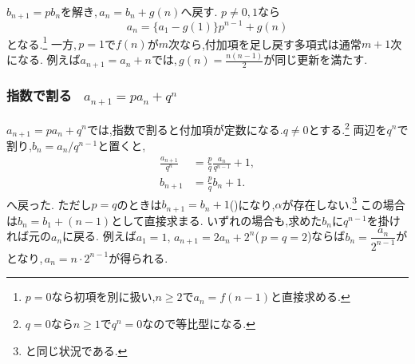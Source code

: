    $b_{n+1}=pb_n$を解き,\,$a_n=b_n+g(n)$へ戻す.
    $p\ne0,1$なら
    \[
      a_n=\{a_1-g(1)\}p^{n-1}+g(n)
    \]
    となる.\footnote{$p=0$なら初項を別に扱い,$n\ge2$で$a_n=f(n-1)$と直接求める.}
    一方,\,$p=1$で$f(n)$が$m$次なら,付加項を足し戻す多項式は通常$m+1$次になる.
    例えば$a_{n+1}=a_n+n$では,\,$g(n)=\frac{n(n-1)}2$が同じ更新を満たす.

  \subsubsection{\texorpdfstring{指数で割る  \, $\displaystyle a_{n+1}=pa_n+q^n$}{指数で割る}}
    $a_{n+1}=pa_n+q^n$では,指数で割ると付加項が定数になる.$q\ne0$とする.\footnote{$q=0$なら$n\ge1$で$q^n=0$なので等比型になる.}
    両辺を$q^n$で割り,$b_n=a_n/q^{n-1}$と置くと,
    \[
      \begin{aligned}
        \frac{a_{n+1}}{q^n}&=\frac pq\frac{a_n}{q^{n-1}}+1,\\
        b_{n+1}&=\frac pq b_n+1.
      \end{aligned}
    \]
    へ戻った.
    ただし$p=q$のときは$b_{n+1}=b_n+1$()になり,$\alpha$が存在しない.\footnote{と同じ状況である.}
    この場合は$b_n=b_1+(n-1)$として直接求まる.
    いずれの場合も,求めた$b_n$に$q^{n-1}$を掛ければ元の$a_n$に戻る.
    例えば$a_1=1,\,a_{n+1}=2a_n+2^n$(\,$p=q=2$)ならば$b_n=\dfrac{a_n}{2^{n-1}}$がとなり,\,$a_n=n\cdot2^{n-1}$が得られる.
